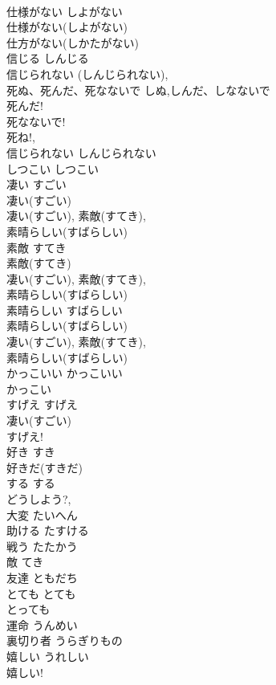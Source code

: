 \documentclass[8pt]{extreport}
\begin{document}
\begin{CJK}{UTF8}{min}
\\	仕様がない	しよがない	
\\	仕様がない(しよがない) 
\\	仕方がない(しかたがない)	
\\	信じる	しんじる	
\\	信じられない (しんじられない), 
\\	死ぬ、死んだ、死なないで	しぬ,しんだ、しなないで	
\\	死んだ! 
\\	死なないで! 
\\	死ね!, 
\\	信じられない	しんじられない	
\\	しつこい	しつこい	
\\	凄い	すごい	
\\	凄い(すごい) 
\\	凄い(すごい), 素敵(すてき), 
\\	素晴らしい(すばらしい) 
\\	素敵	すてき	
\\	素敵(すてき) 
\\	凄い(すごい), 素敵(すてき), 
\\	素晴らしい(すばらしい) 
\\	素晴らしい	すばらしい	
\\	素晴らしい(すばらしい) 
\\	凄い(すごい), 素敵(すてき), 
\\	素晴らしい(すばらしい) 
\\	かっこいい	かっこいい	
\\	かっこい 
\\	すげえ	すげえ	
\\	凄い(すごい) 
\\	すげえ!	
\\	好き	すき	
\\	好きだ(すきだ)
\\	する	する	
\\	どうしよう?,
\\	大変	たいへん	 
\\	助ける	たすける	
\\	戦う	たたかう	
\\	敵	てき	
\\	友達	ともだち	
\\	とても	とても	
\\	とっても
\\	運命	うんめい	
\\	裏切り者	うらぎりもの	
\\	嬉しい	うれしい	
\\	嬉しい! 

\end{CJK}
\end{document}
